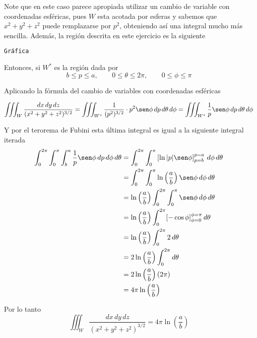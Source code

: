 Note que en este caso parece apropiada utilizar un cambio de variable con coordenadas esféricas, pues $W$ esta acotada por esferas y sabemos que $x^2 + y^2 + z^2$ puede remplazarse por $p^2$, obteniendo así una integral mucho más sencilla. Además, la región descrita en este ejercicio es la siguiente

\texttt{Gráfica}

Entonces, si $W^*$ es la región dada por
\[b \leq p \leq a, \qquad 0 \leq \theta \leq 2\pi, \qquad 0 \leq \phi \leq \pi\]

Aplicando la fórmula del cambio de variables con coordenadas esféricas

\[\iiint_W \frac{dx\, dy\, dz}{(x^2 + y^2 + z^2)^{3/2}}	= \iiint_{W^*} \frac{1}{(p^2)^{3/2}} \cdot p^2\sen\phi\, dp\, d\theta\, d\phi = \iiint_{W^*} \frac{1}{p} \sen \phi\, dp\, d\theta\, d\phi\]

Y por el terorema de Fubini esta última integral es igual a la siguiente integral iterada
\begin{align*}
	\int_{0}^{2\pi} \int_{0}^{\pi} \int_b^a\frac{1}{p} \sen\phi \, dp\, d\phi\, d\theta &= \int_{0}^{2\pi} \int_{0}^{\pi} \left[\ln|p| \sen\phi\right]_{p=b}^{p=a} \, d\phi\, d\theta\\
	&= \int_{0}^{2\pi} \int_{0}^{\pi} \ln\left(\frac{a}{b}\right) \sen\phi \, d\phi\, d\theta\\
	&= \ln\left(\frac{a}{b}\right) \int_{0}^{2\pi} \int_{0}^{\pi} \sen\phi \, d\phi\, d\theta\\
	&= \ln\left(\frac{a}{b}\right) \int_{0}^{2\pi} [-\cos\phi]_{\phi=0}^{\phi=\pi}\, d\theta\\
	&= \ln\left(\frac{a}{b}\right) \int_{0}^{2\pi} 2\, d\theta\\
	&= 2\ln\left(\frac{a}{b}\right) \int_{0}^{2\pi} d\theta\\
	&= 2\ln\left(\frac{a}{b}\right) (2\pi)\\
	&= 4\pi\ln\left(\frac{a}{b}\right)
\end{align*}

Por lo tanto
\[\iiint_W \frac{dx\, dy\, dz}{(x^2 + y^2 + z^2)^{3/2}} = 4\pi\ln\left(\frac{a}{b}\right)\]